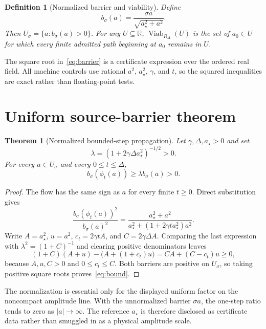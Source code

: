 \documentclass[11pt]{article}
\newtheorem{definition}{Definition}
\newtheorem{theorem}{Theorem}
\newcommand{\R}{\mathbb R}
\newcommand{\Us}{U_{\sigma}}
\newcommand{\bs}{b_{\sigma}}
\newcommand{\Viab}{\operatorname{Viab}}
\begin{document}
\begin{definition}[Normalized barrier and viability]
Define
\begin{equation}
 \bs(a)=\frac{\sigma a}{\sqrt{a_\star^2+a^2}}.
 \label{eq:barrier}
\end{equation}
Then $\Us=\{a:\bs(a)>0\}$.  For any $U\subseteq\R$,
$\Viab_{R_\Delta}(U)$ is the set of $a_0\in U$ for which every finite
admitted path beginning at $a_0$ remains in $U$.
\end{definition}

The square root in~\eqref{eq:barrier} is a certificate expression over the
ordered real field.  All machine controls use rational $a^2$, $a_\star^2$,
$\gamma$, and $t$, so the squared inequalities are exact rather than
floating-point tests.

\section{Uniform source-barrier theorem}

\begin{theorem}[Normalized bounded-step propagation]
\label{thm:barrier}
Let $\gamma,\Delta,a_\star>0$ and set
\begin{equation}
 \lambda=
 \left(1+2\gamma\Delta a_\star^2\right)^{-1/2}>0.
 \label{eq:lambda}
\end{equation}
For every $a\in\Us$ and every $0\leq t\leq\Delta$,
\begin{equation}
 \bs(\phi_t(a))\geq\lambda\bs(a)>0.
 \label{eq:bound}
\end{equation}
\end{theorem}

\begin{proof}
The flow has the same sign as $a$ for every finite $t\geq0$.  Direct
substitution gives
\[
 \frac{\bs(\phi_t(a))^2}{\bs(a)^2}
 =\frac{a_\star^2+a^2}
 {a_\star^2+\left(1+2\gamma t a_\star^2\right)a^2}.
\]
Write $A=a_\star^2$, $u=a^2$, $c_t=2\gamma tA$, and
$C=2\gamma\Delta A$.  Comparing the last expression with
$\lambda^2=(1+C)^{-1}$ and clearing positive denominators leaves
\[
 (1+C)(A+u)-\bigl(A+(1+c_t)u\bigr)
 =CA+(C-c_t)u\geq0,
\]
because $A,u,C>0$ and $0\leq c_t\leq C$.  Both barriers are positive on
$\Us$, so taking positive square roots proves~\eqref{eq:bound}.
\end{proof}

The normalization is essential only for the displayed uniform factor on the
noncompact amplitude line.  With the unnormalized barrier $\sigma a$, the
one-step ratio tends to zero as $|a|\to\infty$.  The reference $a_\star$ is
therefore disclosed as certificate data rather than smuggled in as a physical
amplitude scale.
\end{document}
